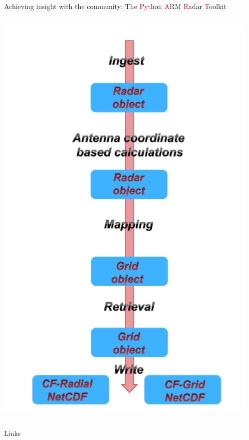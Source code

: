\documentclass[final]{beamer}
\begin{document}
\begin{frame}{}
\begin{columns}[t]
\begin{column}{.3\linewidth}
\begin{block}{Achieving insight with the community: The \textcolor{red}{Py}thon \textcolor{red}{A}RM \textcolor{red}{R}adar \textcolor{red}{T}oolkit}
\begin{columns}[t]
\begin{column}{.4\linewidth}
                       \includegraphics[width=0.9\linewidth]{figures/pyart-flow}\\[1ex]   
                   \end{column}
               \end{columns}
                       \end{block}
        
         \begin{block}{Links}
         \end{block}

     

    \end{column}
      \begin{column}{.3\linewidth}
  \vfill
 

\end{column}
\end{columns}
\end{frame}
\end{document}
